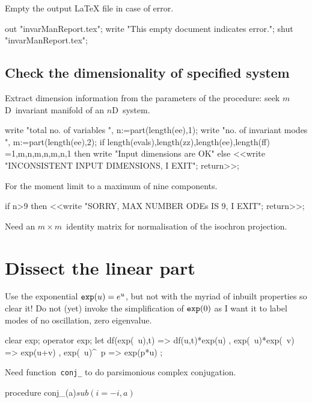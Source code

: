 \documentclass[11pt,a5paper]{article}
\begin{document}
Empty the output LaTeX file in case of error.
\begin{reduce}
out "invarManReport.tex";
write "This empty document indicates error.";
shut "invarManReport.tex";
\end{reduce}


 


\subsection{Check the dimensionality of specified system}
Extract dimension information from the parameters of the
procedure: seek $m$D~invariant manifold of an $n$D~system.
\begin{reduce}
write "total no. of variables ",
n:=part(length(ee),1);
write "no. of invariant modes ",
m:=part(length(ee),2);
if {length(evals),length(zz),length(ee),length(ff)}
  ={{1,m},{n,m},{n,m},{n,1}} 
  then write "Input dimensions are OK" 
  else <<write "INCONSISTENT INPUT DIMENSIONS, I EXIT"; 
      return>>;
\end{reduce}

For the moment limit to a maximum of nine components.
\begin{reduce}
if n>9 then <<write "SORRY, MAX NUMBER ODEs IS 9, I EXIT"; 
    return>>;
\end{reduce}

Need an \(m\times m\)~identity matrix for normalisation of
the isochron projection.


\section{Dissect the linear part}

Use the exponential $\verb|exp|(u)=e^{u}$, but not with the
myriad of inbuilt properties so clear it! Do not (yet)
invoke the simplification of $\verb|exp|(0)$ as I want it to
label modes of no oscillation, zero eigenvalue.
\begin{reduce}
clear exp; operator exp;
let { df(exp(~u),t) => df(u,t)*exp(u)
    , exp(~u)*exp(~v) => exp(u+v)
    , exp(~u)^~p => exp(p*u)
    };
\end{reduce}

Need function~\verb|conj_| to do parsimonious complex
conjugation.   
\begin{reduce}
procedure conj_(a)$ sub(i=-i,a)$
\end{reduce}
\end{document}
